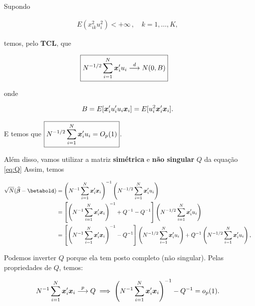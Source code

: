 \documentclass[11pt,oneside,a4paper]{article}
\numberwithin{equation}{section}
\begin{document}
\noindent
Supondo

\vspace{-1 em}
\begin{align*}
	E( x_{ik}^{2} u_{i}^{2} ) < + \infty \, , \quad k=1, \dots, K, 
\end{align*}

\noindent
temos, pelo \textbf{TCL}, que

\vspace{-1 em}
\begin{align} \label{eq:limxu}
\Aboxed{ N^{-1/2} \sum_{i=1}^{N} \mbs{x}_{i}' u_{i} \arrowd N(0, B) }
\end{align}

\noindent
onde 

\vspace{-1 em}
\begin{align*}
B =
E[\boldsymbol{x}_{i}' u_{i}' u_{i} \boldsymbol{x}_{i}] =
E[ u_{i}^2 \boldsymbol{x}_{i}' \boldsymbol{x}_{i} ].
\end{align*}

E temos que $\boxed{N^{-1/2} \sum_{i=1}^{N} \boldsymbol{x}_{i}' u_{i} = O_{p}(1)}$.

\vspace{1 em}
Além disso, vamos utilizar a matriz \textbf{simétrica} e \textbf{não singular} $Q$ da equação \eqref{eq:Q}
Assim, temos 

\vspace{-1 em}
\begin{align*}
\sqrt{N} (\betahatbold - \betabold) &=
\left( N^{-1} \sum_{i=1}^{N} \mbs{x}_{i}' \mbs{x}_{i} \right)^{-1}
\left( N^{-1/2} \sum_{i=1}^{N} \mbs{x}_{i}' u_{i} \right)
\\ &=
\left[ 
\left( N^{-1} \sum_{i=1}^{N} \mbs{x}_{i}' \mbs{x}_{i} \right)^{-1} 
+ Q^{-1} - Q^{-1}
\right]
\left( N^{-1/2} \sum_{i=1}^{N} \mbs{x}_{i}' u_{i} \right)
\\ &=
\left[ 
\left( N^{-1} \sum_{i=1}^{N} \mbs{x}_{i}' \mbs{x}_{i} \right)^{-1} 
- Q^{-1}
\right]
\left( N^{-1/2} \sum_{i=1}^{N} \mbs{x}_{i}' u_{i} \right)
+ Q^{-1} 
\left( N^{-1/2} \sum_{i=1}^{N} \mbs{x}_{i}' u_{i} \right),
\end{align*}

\noident
Podemos inverter $Q$ porque ela tem posto completo (não singular).
Pelas propriedades de $Q$, temos:

\vspace{-1 em}
\begin{align*}
N^{-1} \sum_{i=1}^{N} \boldsymbol{x}_{i}' \boldsymbol{x}_{i}  \overset{p}{\longrightarrow}  Q
\implies
\left( N^{-1} \sum_{i=1}^{N} \boldsymbol{x}_{i}' \boldsymbol{x}_{i} \right)^{-1}  - Q^{-1} = o_{p}(1).
\end{align*}
\end{document}
